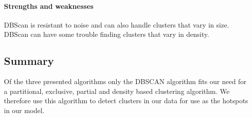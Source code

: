 \paragraph{Strengths and weaknesses}
DBScan is resistant to noise and can also handle clusters that vary in size.
DBScan can have some trouble finding clusters that vary in density.

\subsection{Summary} Of the three presented algorithms only the DBSCAN algorithm fits our need for a partitional, exclusive, partial and density based clustering algorithm.
We therefore use this algorithm to detect clusters in our data for use as the hotspots in our model.